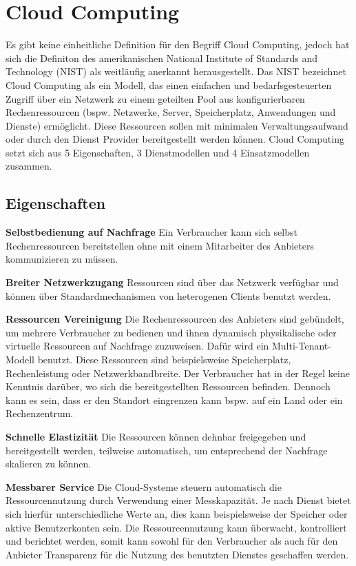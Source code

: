 \section{Cloud Computing}
Es gibt keine einheitliche Definition für den Begriff \glqq Cloud Computing\grqq, jedoch hat sich die Definiton des amerikanischen National Institute of Standards and Technology (NIST) als weitläufig anerkannt herausgestellt. Das NIST bezeichnet Cloud Computing als ein Modell, das einen einfachen und bedarfsgesteuerten Zugriff über ein Netzwerk zu einem geteilten Pool aus konfigurierbaren Rechenressourcen (bspw. Netzwerke, Server, Speicherplatz, Anwendungen und Dienste) ermöglicht. Diese Ressourcen sollen mit minimalen Verwaltungsaufwand oder durch den Dienst Provider bereitgestellt werden können. Cloud Computing setzt sich aus 5 Eigenschaften, 3 Dienstmodellen und 4 Einsatzmodellen zusammen.

\subsection{Eigenschaften} 

\textbf{Selbstbedienung auf Nachfrage} \hfill 
Ein Verbraucher kann sich selbst Rechenressourcen bereitstellen ohne mit einem Mitarbeiter des Anbieters kommunizieren zu müssen.

\textbf{Breiter Netzwerkzugang} \hfill
Ressourcen sind über das Netzwerk verfügbar und können über Standardmechanismen von heterogenen Clients benutzt werden.

\textbf{Ressourcen Vereinigung} \hfill
Die Rechenressourcen des Anbieters sind gebündelt, um mehrere Verbraucher zu bedienen und ihnen dynamisch physikalische oder virtuelle Ressourcen auf Nachfrage zuzuweisen. Dafür wird ein Multi-Tenant-Modell benutzt. Diese Ressourcen sind beispielsweise Speicherplatz, Rechenleistung oder Netzwerkbandbreite. Der Verbraucher hat in der Regel keine Kenntnis darüber, wo sich die bereitgestellten Ressourcen befinden. Dennoch kann es sein, dass er den Standort eingrenzen kann bspw. auf ein Land oder ein Rechenzentrum.

\textbf{Schnelle Elastizität} \hfill
Die Ressourcen können dehnbar freigegeben und bereitgestellt werden, teilweise automatisch, um entsprechend der Nachfrage skalieren zu können.

\textbf{Messbarer Service} \hfill
Die Cloud-Systeme steuern automatisch die Ressourcennutzung durch Verwendung einer Messkapazität. Je nach Dienst bietet sich hierfür unterschiedliche Werte an, dies kann beispielsweise der Speicher oder aktive Benutzerkonten sein. Die Ressourcennutzung kann überwacht, kontrolliert und berichtet werden, somit kann sowohl für den Verbraucher als auch für den Anbieter Transparenz für die Nutzung des benutzten Dienstes geschaffen werden.


